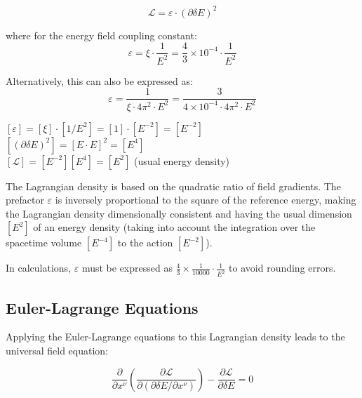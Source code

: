 \documentclass[12pt,a4paper]{article}
\newcommand{\dfield}{\delta E}
\theoremstyle{definition}
\begin{document}
	\begin{equation}
		\boxed{\mathcal{L} = \varepsilon \cdot (\partial\dfield)^2}
	\end{equation}
	
	where for the energy field coupling constant:
	\begin{equation}
		\varepsilon = \xi \cdot \frac{1}{E^2} = \frac{4}{3} \times 10^{-4} \cdot \frac{1}{E^2}
	\end{equation}
	
	Alternatively, this can also be expressed as:
	\begin{equation}
		\varepsilon = \frac{1}{\xi \cdot 4\pi^2 \cdot E^2} = \frac{3}{4 \times 10^{-4} \cdot 4\pi^2 \cdot E^2}
	\end{equation}
	
	\begin{einheitencheck}
		$[\varepsilon] = [\xi] \cdot [1/E^2] = [1] \cdot [E^{-2}] = [E^{-2}]$\\
		$[(\partial\dfield)^2] = [E \cdot E]^2 = [E^4]$\\
		$[\mathcal{L}] = [E^{-2}][E^4] = [E^2]$ (usual energy density) \checkmark
	\end{einheitencheck}
	
	\begin{verhaltnis}
		The Lagrangian density is based on the quadratic ratio of field gradients. The prefactor $\varepsilon$ is inversely proportional to the square of the reference energy, making the Lagrangian density dimensionally consistent and having the usual dimension $[E^2]$ of an energy density (taking into account the integration over the spacetime volume $[E^{-4}]$ to the action $[E^{-2}]$).
		
		In calculations, $\varepsilon$ must be expressed as $\frac{4}{3} \times \frac{1}{10000} \cdot \frac{1}{E^2}$ to avoid rounding errors.
	\end{verhaltnis}
	
	\subsection{Euler-Lagrange Equations}
	
	Applying the Euler-Lagrange equations to this Lagrangian density leads to the universal field equation:
	
	\begin{equation}
		\frac{\partial}{\partial x^\nu}\left(\frac{\partial \mathcal{L}}{\partial(\partial \dfield/\partial x^\nu)}\right) - \frac{\partial \mathcal{L}}{\partial \dfield} = 0
	\end{equation}
	
\end{document}
